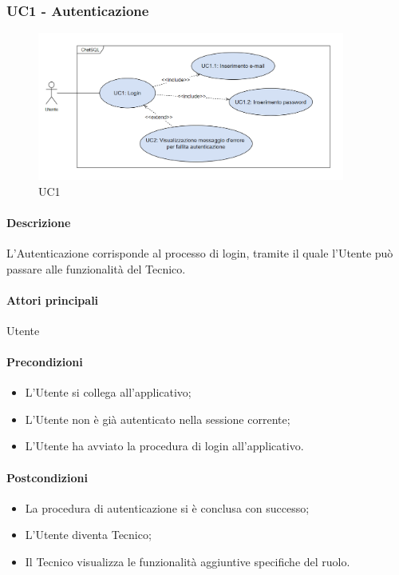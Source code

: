 \subsubsection{UC1 - Autenticazione}\label{UC1}

\begin{figure}[H]
  \centering
  \includegraphics[width=0.90\textwidth]{assets/uc1.png}
  \caption{UC1}
\end{figure}

\paragraph*{Descrizione}
L’Autenticazione corrisponde al processo di login, tramite il quale l'Utente può passare alle funzionalità del Tecnico.

\paragraph*{Attori principali}
Utente

\paragraph*{Precondizioni}
\begin{itemize}
  \item L’Utente si collega all’applicativo;
  \item L'Utente non è già autenticato nella sessione corrente;
  \item L’Utente ha avviato la procedura di login all’applicativo.
\end{itemize}

\paragraph*{Postcondizioni}
\begin{itemize}
  \item La procedura di autenticazione si è conclusa con successo;
  \item L’Utente diventa Tecnico;
  \item Il Tecnico visualizza le funzionalità aggiuntive specifiche del ruolo.  
\end{itemize}

